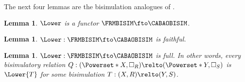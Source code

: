 \documentclass[10pt,a4paper]{article}
\newtheorem{lemma}[theorem]{Lemma}
\begin{document}
The next four lemmas are the bisimulation analogues of
.

\begin{lemma}
  \(\Lower\) is a functor \(\FRMBISIM \fto \CABAOBISIM\).
\end{lemma}

\begin{lemma}
  \(\Lower : \FRMBISIM \fto \CABAOBISIM\) is faithful.
\end{lemma}

\begin{lemma}\label{lem:lower-CABAOBISIM-full}
  \(\Lower : \FRMBISIM \fto \CABAOBISIM\) is full. In other words, every
  bisimulatory relation \(Q : (\Powerset*{X}, \Box_R) \relto (\Powerset*{Y},
  \Box_S)\) is \(\Lower{T}\) for some bisimulation \(T : (X, R) \relto (Y,
  S)\).
\end{lemma}
\end{document}
